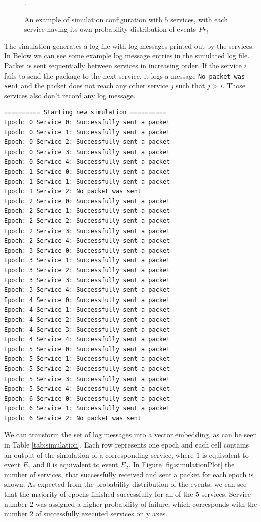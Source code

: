 \begin{figure}\centering
    
	\caption{An example of simulation configuration with $5$ services, with each service having its own probability distribution of events $Pr_i$}.
	\label{figure:simulation}
\end{figure}

The simulation generates a log file with log messages printed out by the services. In Below we can see some example log message entries in the simulated log file. Packet is sent sequentially between services in increasing order. If the service $i$ fails to send the package to the next service, it logs a message \texttt{No packet was sent} and the packet does not reach any other service $j$ such that $j$ > $i$. Those services also don't record any log message. 

\begin{verbatim}
========== Starting new simulation ==========
Epoch: 0 Service 0: Successfully sent a packet
Epoch: 0 Service 1: Successfully sent a packet
Epoch: 0 Service 2: Successfully sent a packet
Epoch: 0 Service 3: Successfully sent a packet
Epoch: 0 Service 4: Successfully sent a packet
Epoch: 1 Service 0: Successfully sent a packet
Epoch: 1 Service 1: Successfully sent a packet
Epoch: 1 Service 2: No packet was sent
Epoch: 2 Service 0: Successfully sent a packet
Epoch: 2 Service 1: Successfully sent a packet
Epoch: 2 Service 2: Successfully sent a packet
Epoch: 2 Service 3: Successfully sent a packet
Epoch: 2 Service 4: Successfully sent a packet
Epoch: 3 Service 0: Successfully sent a packet
Epoch: 3 Service 1: Successfully sent a packet
Epoch: 3 Service 2: Successfully sent a packet
Epoch: 3 Service 3: Successfully sent a packet
Epoch: 3 Service 4: Successfully sent a packet
Epoch: 4 Service 0: Successfully sent a packet
Epoch: 4 Service 1: Successfully sent a packet
Epoch: 4 Service 2: Successfully sent a packet
Epoch: 4 Service 3: Successfully sent a packet
Epoch: 4 Service 4: Successfully sent a packet
Epoch: 5 Service 0: Successfully sent a packet
Epoch: 5 Service 1: Successfully sent a packet
Epoch: 5 Service 2: Successfully sent a packet
Epoch: 5 Service 3: Successfully sent a packet
Epoch: 5 Service 4: Successfully sent a packet
Epoch: 6 Service 0: Successfully sent a packet
Epoch: 6 Service 1: Successfully sent a packet
Epoch: 6 Service 2: No packet was sent
 \end{verbatim}
 
We can transform the set of log messages into a vector embedding, as can be seen in Table \ref{tab:simulation}. Each row represents one epoch and each cell contains an output of the simulation of a corresponding service, where $1$ is equivalent to event $E_1$ and $0$ is equivalent to event $E_2$. In Figure \ref{fig:simulationPlot} the number of services, that successfully received and sent a packet for each epoch is shown. As expected from the probability distribution of the events, we can see that the majority of epochs finished successfully for all of the $5$ services. Service number $2$ was assigned a higher probability of failure, which corresponds with the number $2$ of successfully executed services on y axes. 

